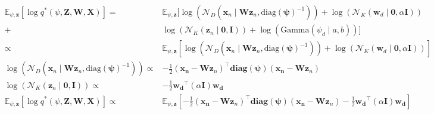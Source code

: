 \documentclass{article}
\begin{document}
\begin{align}
	\mathbb{E}_{\psi, \mathbf{z}}\left[ \log q^*(\psi, \mathbf{Z}, \mathbf{W}, \mathbf{X})\right]  =&\mathbb{E}_{\psi, \mathbf{z}}[ \log\left( \mathcal{N}_{D}(\mathbf{x}_n \mid \mathbf{Wz}_{n},\text{diag}
	(\mathbf{\psi})^{-1})\right) +  \log\left(\mathcal{N}_{K}(\mathbf{w}_d\mid\mathbf{0,}\alpha\mathbf{I})\right) \\+&  \log\left(\mathcal{N}_{K}(\mathbf{z}_n\mid \mathbf{0,I})\right) +\log\left( \text{Gamma}(\psi_d \mid a,b)\right)]\\
	\propto&\mathbb{E}_{\psi, \mathbf{z}}[ \log\left( \mathcal{N}_{D}(\mathbf{x}_n \mid \mathbf{Wz}_{n},\text{diag}
	(\mathbf{\psi})^{-1})\right) +  \log\left(\mathcal{N}_{K}(\mathbf{w}_d\mid\mathbf{0,}\alpha\mathbf{I})\right)] \\
	\log\left( \mathcal{N}_{D}(\mathbf{x}_n \mid \mathbf{Wz}_{n},\text{diag}
	(\mathbf{\psi})^{-1})\right) \propto& -\frac{1}{2}(\mathbf{x_n} -\mathbf{Wz}_{n})^\top\mathbf{\text{diag}(\psi)}(\mathbf{x_n} -\mathbf{Wz}_{n}) \\
	\log\left( \mathcal{N}_{K}(\mathbf{z}_n\mid \mathbf{0,I})\right)  \propto& -\frac{1}{2} \mathbf{w_d}^\top(\alpha\mathbf{I})\mathbf{w_d} \\
	\mathbb{E}_{\psi, \mathbf{z}}\left[ \log q^*(\psi, \mathbf{Z}, \mathbf{W}, \mathbf{X})\right] \propto& \mathbb{E}_{\psi, \mathbf{z}}\left[-\frac{1}{2}(\mathbf{x_n} -\mathbf{Wz}_{n})^\top\mathbf{\text{diag}(\psi)}(\mathbf{x_n} -\mathbf{Wz}_{n})-\frac{1}{2} \mathbf{w_d}^\top(\alpha\mathbf{I})\mathbf{w_d} \right] 
\end{align}
\end{document}
